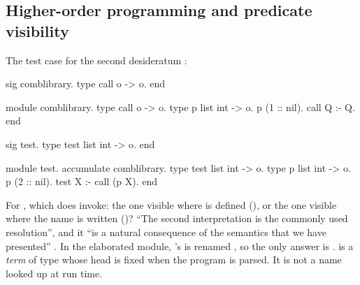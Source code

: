 \subsection{Higher-order programming and predicate visibility}\label{sec:hoprog-callp}

The test case for the second desideratum :
\begin{lprolog}
sig comblibrary.
type  call  o -> o.
end

module comblibrary.
type  call  o -> o.
type  p  list int -> o.
p (1 :: nil).
call Q :- Q.
end

sig test.
type  test  list int -> o.
end

module test.
accumulate comblibrary.
type  test  list int -> o.
type  p  list int -> o.
p (2 :: nil).
test X :- call (p X).
end
\end{lprolog}
For , which  does  invoke: the one visible where  is
defined (), or the one visible where the name is written ()? ``The second
interpretation is the commonly used resolution'', and it ``is a natural consequence of the semantics
that we have presented'' . In the elaborated module, 's  is renamed
, so the only answer is  .  is a \emph{term} of type
 whose head is fixed when the program is parsed. It is not a name looked up at run time.

